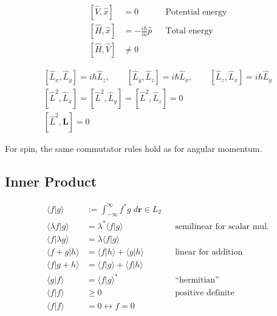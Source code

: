 \noindent\begin{align*}
    \left[\widehat{V},\widehat{x}\right]  & =0                            &  & \text{Potential energy} \\
    \left[\widehat{H},\widehat{x}\right]  & =-\frac{i\hbar}{m}\widehat{p} &  & \text{Total energy}     \\
    \left[\widehat{H}, \widehat{V}\right] & \neq 0
\end{align*}

\label{comm_am_sp}
\noindent\begin{gather*}
    \left[\widehat{L}_{x},\widehat{L}_{y}\right] =i\hbar \widehat{L}_{z}, \qquad \left[\widehat{L}_{y},\widehat{L}_{z}\right]  =i\hbar \widehat{L}_{x}, \qquad \left[\widehat{L}_{z},\widehat{L}_{x}\right]  =i\hbar \widehat{L}_{y}      \\
    \left[\widehat{L}^{2},\widehat{L}_{x}\right] = \left[\widehat{L}^{2},\widehat{L}_{y}\right] = \left[\widehat{L}^{2},\widehat{L}_{z}\right] = 0\\
    \left[\widehat{L}^2, \mathbf{L}\right]=0
\end{gather*}

For spin, the same commutator rules hold as for angular momentum.

\subsection{Inner Product}\label{ssec:InnerProd}
\noindent\begin{align*}
    \langle f|g \rangle         & := \int_{-\infty}^{\infty} f^* g\; d \mathbf{r} \in L_2 &  &                                   \\
    \langle \lambda f|g \rangle & =\lambda^* \langle f|g \rangle                          &  & \text{semilinear for scalar mul.} \\
    \langle f|\lambda g \rangle & =\lambda \langle f|g \rangle                                                                   \\
    \langle f+g|h \rangle       & =\langle f|h \rangle + \langle g|h \rangle              &  & \text{linear for addition}        \\
    \langle f|g+h \rangle       & =\langle f|g \rangle + \langle f|h \rangle                                                     \\
    \langle g|f \rangle         & = {\langle f|g \rangle}^*                               &  & \text{``hermitian''}              \\
    \langle f|f \rangle         & \ge 0                                                   &  & \text{positive definite}          \\
    \langle f|f \rangle         & = 0 \leftrightarrow f=0
\end{align*}

